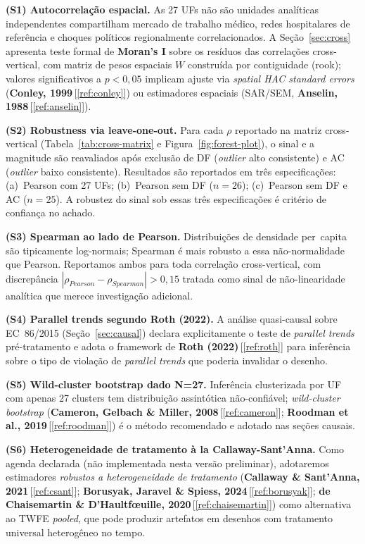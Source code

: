 \documentclass[12pt,a4paper,oneside]{article}
\begin{document}
\textbf{(S1) Autocorrelação espacial.} As 27 UFs não são unidades
analíticas independentes \textemdash{} compartilham mercado de
trabalho médico, redes hospitalares de referência e choques
políticos regionalmente correlacionados. A Seção~\ref{sec:cross}
apresenta teste formal de \textbf{Moran's I} sobre os resíduos das
correlações cross-vertical, com matriz de pesos espaciais $W$
construída por contiguidade (rook); valores significativos a
$p<0{,}05$ implicam ajuste via \textit{spatial HAC standard errors}
(\textbf{Conley, 1999}\,[\ref{ref:conley}]) ou estimadores espaciais
(SAR/SEM, \textbf{Anselin, 1988}\,[\ref{ref:anselin}]).

\textbf{(S2) Robustness via leave-one-out.} Para cada $\rho$
reportado na matriz cross-vertical (Tabela~\ref{tab:cross-matrix} e
Figura~\ref{fig:forest-plot}), o sinal e a magnitude são reavaliados
após exclusão de DF (\textit{outlier} alto consistente) e AC
(\textit{outlier} baixo consistente). Resultados são reportados
em três especificações: (a)~Pearson com 27 UFs; (b)~Pearson sem DF
($n=26$); (c)~Pearson sem DF e AC ($n=25$). A robustez do sinal
sob essas três especificações é critério de confiança no achado.

\textbf{(S3) Spearman ao lado de Pearson.} Distribuições de
densidade per~capita são tipicamente log-normais; Spearman é mais
robusto a essa não-normalidade que Pearson. Reportamos ambos para
toda correlação cross-vertical, com discrepância $|\rho_{Pearson} -
\rho_{Spearman}| > 0{,}15$ tratada como sinal de não-linearidade
analítica que merece investigação adicional.

\textbf{(S4) Parallel trends segundo Roth (2022).} A análise
quasi-causal sobre EC~86/2015 (Seção~\ref{sec:causal}) declara
explicitamente o teste de \textit{parallel trends} pré-tratamento
e adota o framework de \textbf{Roth (2022)}\,[\ref{ref:roth}] para
inferência sobre o tipo de violação de \textit{parallel trends} que
poderia invalidar o desenho.

\textbf{(S5) Wild-cluster bootstrap dado N=27.} Inferência
clusterizada por UF com apenas 27 clusters tem distribuição
assintótica não-confiável; \textit{wild-cluster bootstrap}
(\textbf{Cameron, Gelbach \& Miller, 2008}\,[\ref{ref:cameron}];
\textbf{Roodman et al., 2019}\,[\ref{ref:roodman}]) é o método
recomendado e adotado nas seções causais.

\textbf{(S6) Heterogeneidade de tratamento à la Callaway-Sant'Anna.}
Como agenda declarada (não implementada nesta versão preliminar),
adotaremos estimadores \textit{robustos a heterogeneidade de
tratamento} (\textbf{Callaway \& Sant'Anna, 2021}\,[\ref{ref:csant}];
\textbf{Borusyak, Jaravel \& Spiess, 2024}\,[\ref{ref:borusyak}];
\textbf{de Chaisemartin \& D'Haultfœuille, 2020}\,[\ref{ref:chaisemartin}])
como alternativa ao TWFE \textit{pooled}, que pode produzir
artefatos em desenhos com tratamento universal heterogêneo no tempo.
\end{document}
